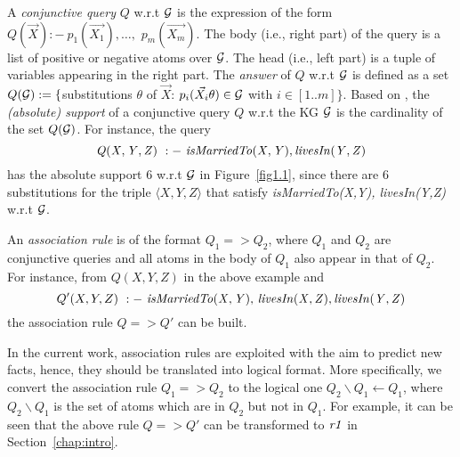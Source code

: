 A \emph{conjunctive query} $Q$ w.r.t $\mathcal{G}$ is the expression of the form $Q(\vec{X}):-\ p_1(\vec{X_1}), \dotsc,$ $p_m(\vec{X_m})$. The body (i.e., right part) of the query is a list of positive or negative atoms over $\mathcal{G}$. The head (i.e., left part) is a tuple of variables appearing in the right part. The \emph{answer} of $Q$ w.r.t $\mathcal{G}$ is defined as a set $Q(\mathcal{G}):=\{$substitutions $\theta$ of $\vec{X}$: $p_i(\vec{X_i}\theta) \in \mathcal{G}$ with $i \in [1..m]\}$. Based on \cite{ref53}, the \emph{(absolute) support} of a conjunctive query $Q$ w.r.t the KG $\mathcal{G}$ is the cardinality of the set $Q(\mathcal{G})$. For instance, the query
\begin{equation}\mathit{Q(X,Y,Z)\ :-\ isMarriedTo(X,Y),\, }\mathit{livesIn(Y,Z)}
\end{equation}
has the absolute support $6$ w.r.t $\mathcal{G}$ in Figure~\ref{fig1.1}, since there are $6$ substitutions for the triple $\langle X, Y, Z \rangle$ that satisfy \textit{isMarriedTo(X,Y), livesIn(Y,Z)} w.r.t $\mathcal{G}$.

An \emph{association rule} is of the format $Q_1 => Q_2$, where $Q_1$ and $Q_2$ are conjunctive queries and all atoms in the body of $Q_1$ also appear in that of $Q_2$. For instance, from $Q(X,Y,Z)$ in the above example and
\begin{equation}Q'(X,Y,Z)\ :-\ \mi{isMarriedTo(X,Y),\,livesIn(X,Z),\,} \mi{livesIn(Y,Z)}
\end{equation} the association rule $Q => Q'$ can be built.

In the current work, association rules are exploited with the aim to predict new facts, hence, they should be translated into logical format. More specifically, we convert the association rule $Q_1=>Q_2$ to the logical one $Q_2\backslash Q_1 \leftarrow Q_1$, where $Q_2 \backslash Q_1$ is the set of atoms which are in $Q_2$ but not in $Q_1$. For example, it can be seen that the above rule $Q=>Q'$ can be transformed to $\mathit{r1}$ in Section~\ref{chap:intro}.

